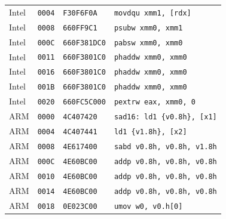 \begin{table}[htbp]
\begin{tabular}{@{}l|l|l|p{7.2cm}@{}}
Intel & \texttt{0004} & \texttt{F30F6F0A} & \texttt{movdqu xmm1, [rdx]} \\
Intel & \texttt{0008} & \texttt{660FF9C1} & \texttt{psubw xmm0, xmm1} \\
Intel & \texttt{000C} & \texttt{660F381DC0} & \texttt{pabsw xmm0, xmm0} \\
Intel & \texttt{0011} & \texttt{660F3801C0} & \texttt{phaddw xmm0, xmm0} \\
Intel & \texttt{0016} & \texttt{660F3801C0} & \texttt{phaddw xmm0, xmm0} \\
Intel & \texttt{001B} & \texttt{660F3801C0} & \texttt{phaddw xmm0, xmm0} \\
Intel & \texttt{0020} & \texttt{660FC5C000} & \texttt{pextrw eax, xmm0, 0} \\
\midrule
ARM & \texttt{0000} & \texttt{4C407420} & \texttt{sad16: ld1 \{v0.8h\}, [x1]} \\
ARM & \texttt{0004} & \texttt{4C407441} & \texttt{ld1 \{v1.8h\}, [x2]} \\
ARM & \texttt{0008} & \texttt{4E617400} & \texttt{sabd v0.8h, v0.8h, v1.8h} \\
ARM & \texttt{000C} & \texttt{4E60BC00} & \texttt{addp v0.8h, v0.8h, v0.8h} \\
ARM & \texttt{0010} & \texttt{4E60BC00} & \texttt{addp v0.8h, v0.8h, v0.8h} \\
ARM & \texttt{0014} & \texttt{4E60BC00} & \texttt{addp v0.8h, v0.8h, v0.8h} \\
ARM & \texttt{0018} & \texttt{0E023C00} & \texttt{umov w0, v0.h[0]} \\
\bottomrule
\end{tabular}
\endgroup
\end{table}
\noindent{}\par
